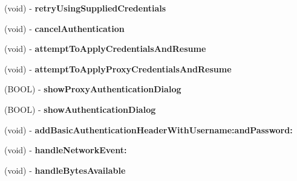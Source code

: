 \begin{DoxyCompactItemize}
\item 
\hypertarget{interface_a_s_i_h_t_t_p_request_aad1efa3b1bc64006cc033bd0d4eee7cc}{
(void) -\/ {\bfseries retry\-Using\-Supplied\-Credentials}}
\label{interface_a_s_i_h_t_t_p_request_aad1efa3b1bc64006cc033bd0d4eee7cc}

\item 
\hypertarget{interface_a_s_i_h_t_t_p_request_a25d3d77f917c5f8b9956f6a45022dae2}{
(void) -\/ {\bfseries cancel\-Authentication}}
\label{interface_a_s_i_h_t_t_p_request_a25d3d77f917c5f8b9956f6a45022dae2}

\item 
\hypertarget{interface_a_s_i_h_t_t_p_request_ad3da0a488faf41101bbf73a8071456e8}{
(void) -\/ {\bfseries attempt\-To\-Apply\-Credentials\-And\-Resume}}
\label{interface_a_s_i_h_t_t_p_request_ad3da0a488faf41101bbf73a8071456e8}

\item 
\hypertarget{interface_a_s_i_h_t_t_p_request_a03ce363e92c2d5dbe7229f021b0230a5}{
(void) -\/ {\bfseries attempt\-To\-Apply\-Proxy\-Credentials\-And\-Resume}}
\label{interface_a_s_i_h_t_t_p_request_a03ce363e92c2d5dbe7229f021b0230a5}

\item 
\hypertarget{interface_a_s_i_h_t_t_p_request_ad9c4b7b0abc790e74806860c6d7a7a5b}{
(\-B\-O\-O\-L) -\/ {\bfseries show\-Proxy\-Authentication\-Dialog}}
\label{interface_a_s_i_h_t_t_p_request_ad9c4b7b0abc790e74806860c6d7a7a5b}

\item 
\hypertarget{interface_a_s_i_h_t_t_p_request_a64d812546f152b29ddd614938ffa5539}{
(\-B\-O\-O\-L) -\/ {\bfseries show\-Authentication\-Dialog}}
\label{interface_a_s_i_h_t_t_p_request_a64d812546f152b29ddd614938ffa5539}

\item 
\hypertarget{interface_a_s_i_h_t_t_p_request_a0295b7fbbc9af2be76f9dfe06f75f1ca}{
(void) -\/ {\bfseries add\-Basic\-Authentication\-Header\-With\-Username\-:and\-Password\-:}}
\label{interface_a_s_i_h_t_t_p_request_a0295b7fbbc9af2be76f9dfe06f75f1ca}

\item 
\hypertarget{interface_a_s_i_h_t_t_p_request_a271ec6e669cafa5063866022fb3577ba}{
(void) -\/ {\bfseries handle\-Network\-Event\-:}}
\label{interface_a_s_i_h_t_t_p_request_a271ec6e669cafa5063866022fb3577ba}

\item 
\hypertarget{interface_a_s_i_h_t_t_p_request_aefae44a699dc9e70b78930322cfb3558}{
(void) -\/ {\bfseries handle\-Bytes\-Available}}
\label{interface_a_s_i_h_t_t_p_request_aefae44a699dc9e70b78930322cfb3558}


\end{DoxyCompactItemize}
